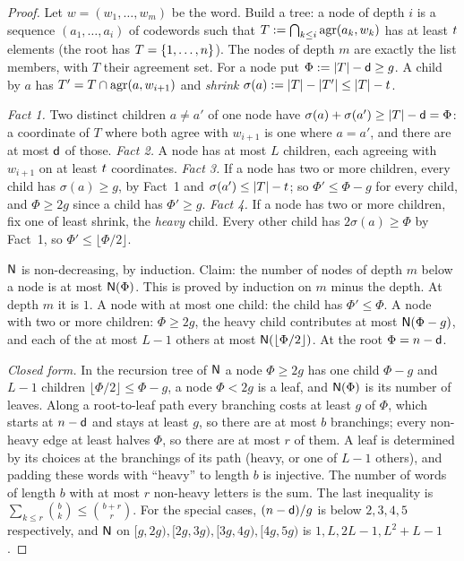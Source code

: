 \begin{proof}
Let $w=(w_1,\dots,w_m)$ be the word. Build a tree: a node of depth $i$ is a sequence $(a_1,\dots,a_i)$ of codewords such that $T:=\bigcap_{k\le i}\operatorname{agr}(a_k,w_k)$ has at least $t$ elements (the root has $T=\{1,\dots,n\}$). The nodes of depth $m$ are exactly the list members, with $T$ their agreement set. For a node put $\Phi:=|T|-\mathsf{d}\ge g$. A child by $a$ has $T'=T\cap\operatorname{agr}(a,w_{i+1})$ and \emph{shrink} $\sigma(a):=|T|-|T'|\le|T|-t$.

\emph{Fact 1.} Two distinct children $a\ne a'$ of one node have $\sigma(a)+\sigma(a')\ge|T|-\mathsf{d}=\Phi$: a coordinate of $T$ where both agree with $w_{i+1}$ is one where $a=a'$, and there are at most $\mathsf{d}$ of those. \emph{Fact 2.} A node has at most $L$ children, each agreeing with $w_{i+1}$ on at least $t$ coordinates. \emph{Fact 3.} If a node has two or more children, every child has $\sigma(a)\ge g$, by Fact~1 and $\sigma(a')\le|T|-t$; so $\Phi'\le\Phi-g$ for every child, and $\Phi\ge2g$ since a child has $\Phi'\ge g$. \emph{Fact 4.} If a node has two or more children, fix one of least shrink, the \emph{heavy} child. Every other child has $2\sigma(a)\ge\Phi$ by Fact~1, so $\Phi'\le\lfloor\Phi/2\rfloor$.

$\mathsf{N}$ is non-decreasing, by induction. Claim: the number of nodes of depth $m$ below a node is at most $\mathsf{N}(\Phi)$. This is proved by induction on $m$ minus the depth. At depth $m$ it is $1$. A node with at most one child: the child has $\Phi'\le\Phi$. A node with two or more children: $\Phi\ge2g$, the heavy child contributes at most $\mathsf{N}(\Phi-g)$, and each of the at most $L-1$ others at most $\mathsf{N}(\lfloor\Phi/2\rfloor)$. At the root $\Phi=n-\mathsf{d}$.

\emph{Closed form.} In the recursion tree of $\mathsf{N}$ a node $\Phi\ge2g$ has one child $\Phi-g$ and $L-1$ children $\lfloor\Phi/2\rfloor\le\Phi-g$, a node $\Phi<2g$ is a leaf, and $\mathsf{N}(\Phi)$ is its number of leaves. Along a root-to-leaf path every branching costs at least $g$ of $\Phi$, which starts at $n-\mathsf{d}$ and stays at least $g$, so there are at most $b$ branchings; every non-heavy edge at least halves $\Phi$, so there are at most $r$ of them. A leaf is determined by its choices at the branchings of its path (heavy, or one of $L-1$ others), and padding these words with ``heavy'' to length $b$ is injective. The number of words of length $b$ with at most $r$ non-heavy letters is the sum. The last inequality is $\sum_{k\le r}\binom bk\le\binom{b+r}{r}$. For the special cases, $(n-\mathsf{d})/g$ is below $2,3,4,5$ respectively, and $\mathsf{N}$ on $[g,2g),[2g,3g),[3g,4g),[4g,5g)$ is $1,L,2L-1,L^2+L-1$.
\end{proof}

